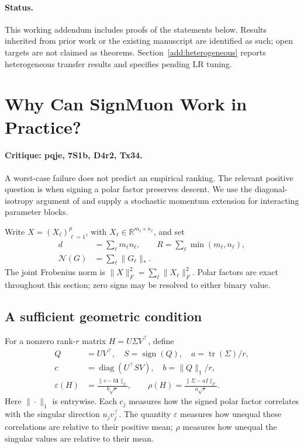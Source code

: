 \begin{abstract}
We organize the theory revision around the reviewers' questions. We give a
geometric sufficient condition for vanilla SignMuon, extend it to stochastic
EMA and Nesterov momentum, and give convex quadratic EF21-SignMuon
counterexamples under decreasing steps and finite-budget tuning.
Further extensions are explicitly marked as open targets.
\end{abstract}

\paragraph{Status.}
This working addendum includes proofs of the statements below. Results
inherited from prior work or the existing manuscript are identified as such;
open targets are not claimed as theorems. Section~\ref{add:heterogeneous}
reports heterogeneous transfer results and specifies pending LR tuning.

\section{Why Can SignMuon Work in Practice?}
\label{add:geometry}
\paragraph{Critique: pqje, 7S1b, D4r2, Tx34.}
A worst-case failure does not predict an empirical ranking. The relevant
positive question is when signing a polar factor preserves descent. We use
the diagonal-isotropy argument of \citet{wang2026olion} and supply a stochastic
momentum extension for interacting parameter blocks.

Write $X=(X_\ell)_{\ell=1}^p$, with
$X_\ell\in\mathbb R^{m_\ell\times n_\ell}$, and set
\begin{align*}
 d&=\sum_\ell m_\ell n_\ell,\qquad
 R=\sum_\ell\min(m_\ell,n_\ell),\\
 \mathcal N(G)&=\sum_\ell\|G_\ell\|_*.
\end{align*}
The joint Frobenius norm is
$\|X\|_F^2=\sum_\ell\|X_\ell\|_F^2$.
Polar factors are exact throughout this section; zero signs may be resolved
to either binary value.

\subsection{A sufficient geometric condition}
For a nonzero rank-$r$ matrix $H=U\Sigma V^\top$, define
\begin{align*}
 Q&=UV^\top,\quad S=\operatorname{sign}(Q),\quad
 a=\operatorname{tr}(\Sigma)/r,\\
 c&=\operatorname{diag}(U^\top SV),\quad b=\|Q\|_1/r,\\
 \varepsilon(H)&=\frac{\|c-b\mathbf1\|_2}{b\sqrt r},\qquad
 \rho(H)=\frac{\|\Sigma-aI\|_F}{a\sqrt r}.
\end{align*}
Here $\|\cdot\|_1$ is entrywise. Each $c_j$ measures how the signed polar
factor correlates with the singular direction $u_jv_j^\top$.
The quantity $\varepsilon$ measures how unequal these correlations are
relative to their positive mean; $\rho$ measures how unequal the singular
values are relative to their mean.

